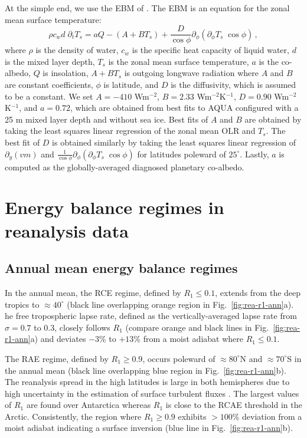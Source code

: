 \documentclass{ametsocV5}
\begin{document}
    At the simple end, we use the EBM of \cite{rose2017}. The EBM is an equation for the zonal mean surface temperature:
    \begin{equation}
      \rho c_w d \; \partial_t T_s = aQ - (A+BT_s)  + \frac{D}{\cos\phi}\partial_\phi\left( \partial_\phi T_s \; \cos\phi \right)\, ,
    \end{equation}
    where $\rho$ is the density of water, $c_w$ is the specific heat capacity of liquid water, $d$ is the mixed layer depth, $T_s$ is the zonal mean surface temperature, $a$ is the co-albedo, $Q$ is insolation, $A+BT_s$ is outgoing longwave radiation where $A$ and $B$ are constant coefficients, $\phi$ is latitude, and $D$ is the diffusivity, which is assumed to be a constant. We set $A=-410$ Wm$^{-2}$, $B=2.33$ Wm$^{-2}$K$^{-1}$, $D=0.90$ Wm$^{-2}$K$^{-1}$, and $a=0.72$, which are obtained from best fits to AQUA configured with a 25 m mixed layer depth and without sea ice. Best fits of $A$ and $B$ are obtained by taking the least squares linear regression of the zonal mean $\mathrm{OLR}$ and $T_s$. The best fit of $D$ is obtained similarly by taking the least squares linear regression of $\partial_y (vm)$ and $\frac{1}{\cos\phi}\partial_\phi \left(\partial_\phi T_s \; \cos\phi \right)$ for latitudes poleward of $25^\circ$. Lastly, $a$ is computed as the globally-averaged diagnosed planetary co-albedo.

\section{Energy balance regimes in reanalysis data} \label{sec:diagnostics}
    \subsection{Annual mean energy balance regimes}
    In the annual mean, the RCE regime, defined by $R_1 \le 0.1$, extends from the deep tropics to $\approx 40^\circ$ (black line overlapping orange region in Fig.~\ref{fig:rea-r1-ann}a). he free tropospheric lapse rate, defined as the vertically-averaged lapse rate from $\sigma=0.7$ to 0.3, closely follows $R_1$ (compare orange and black lines in Fig.~\ref{fig:rea-r1-ann}a) and deviates $-3$\% to $+13$\% from a moist adiabat where $R_1 \le 0.1$.

    The RAE regime, defined by $R_1 \ge 0.9$, occurs poleward of $\approx 80^\circ$N and $\approx 70^\circ$S in the annual mean (black line overlapping blue region in Fig.~\ref{fig:rea-r1-ann}b). The reanalysis spread in the high latitudes is large in both hemispheres due to high uncertainty in the estimation of surface turbulent fluxes \citep{tastula2013,graham2019}. The largest values of $R_1$ are found over Antarctica whereas $R_1$ is close to the RCAE threshold in the Arctic. Consistently, the region where $R_1\ge 0.9$ exhibits $>100\%$ deviation from a moist adiabat indicating a surface inversion (blue line in Fig.~\ref{fig:rea-r1-ann}b).
\end{document}

